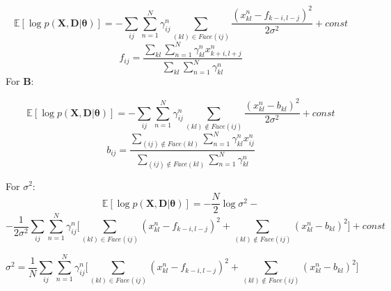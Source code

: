 \documentclass[12pt]{article}
\begin{document}
$$\mathbb{E}[\log p(\mathbf{X}, \mathbf{D}|\boldsymbol{\theta})] = - \sum_{ij} \sum_{n=1}^N \gamma^n_{ij} \sum_{(kl) \in Face(ij)} \frac{(x^n_{kl} - f_{k - i, l - j})^2}{2\sigma^2} + \mathit{const}$$
$$f_{ij} = \frac{\sum\limits_{kl} \sum\limits_{n=1}^N \gamma^n_{kl} x^n_{k+i,l+j}}{\sum\limits_{kl} \sum\limits_{n=1}^N \gamma^n_{kl}}$$
\noindent
For $\mathbf{B}$:

$$\mathbb{E}[\log p(\mathbf{X}, \mathbf{D}|\boldsymbol{\theta})] = - \sum_{ij} \sum_{n=1}^N \gamma^n_{ij} \sum_{(kl) \notin Face(ij)} \frac{(x^n_{kl} - b_{kl})^2}{2\sigma^2} + \mathit{const}$$
$$b_{ij} = \frac{\sum\limits_{(ij) \notin Face(kl)} \sum\limits_{n=1}^N \gamma^n_{kl} x^n_{ij}}{\sum\limits_{(ij) \notin Face(kl)} \sum\limits_{n=1}^N \gamma^n_{kl}}$$

\noindent
For $\sigma^2$:
$$\mathbb{E}[\log p(\mathbf{X}, \mathbf{D}|\boldsymbol{\theta})] = - \frac{N}{2}\log \sigma^2 -$$ $$ - \frac{1}{2\sigma^2} \sum_{ij} \sum_{n=1}^N \gamma^n_{ij} \Big[ \sum_{(kl) \in Face(ij)} (x^n_{kl} - f_{k - i, l - j})^2 + \sum_{(kl) \notin Face(ij)} (x^n_{kl} - b_{kl})^2 \Big] + \mathit{const}$$

$$\sigma^2 = \frac{1}{N}\sum_{ij} \sum_{n=1}^N \gamma^n_{ij} \Big[ \sum_{(kl) \in Face(ij)} (x^n_{kl} - f_{k - i, l - j})^2 + \sum_{(kl) \notin Face(ij)} (x^n_{kl} - b_{kl})^2 \Big]$$
\end{document}
